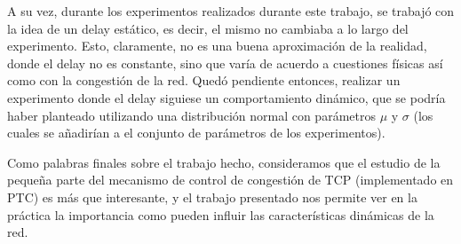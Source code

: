 \par A su vez, durante los experimentos realizados durante este trabajo, se
trabaj\'o con la idea de un delay est\'atico, es decir, el mismo no cambiaba a
lo largo del experimento. Esto, claramente, no es una buena aproximaci\'on de la
realidad, donde el delay no es constante, sino que var\'ia de acuerdo a
cuestiones f\'isicas as\'i como con la congesti\'on de la red. Qued\'o pendiente
entonces, realizar un experimento donde el delay siguiese un comportamiento
din\'amico, que se podr\'ia haber planteado utilizando una distribuci\'on normal
con par\'ametros $\mu$ y $\sigma$ (los cuales se a\~nadir\'ian a el conjunto de
par\'ametros de los experimentos).

\par Como palabras finales sobre el trabajo hecho, consideramos que el estudio
de la peque\~na parte del mecanismo de control de congesti\'on de TCP
(implementado en PTC) es m\'as que interesante, y el trabajo presentado nos
permite ver en la pr\'actica la importancia como pueden influir las
caracter\'isticas din\'amicas de la red.
